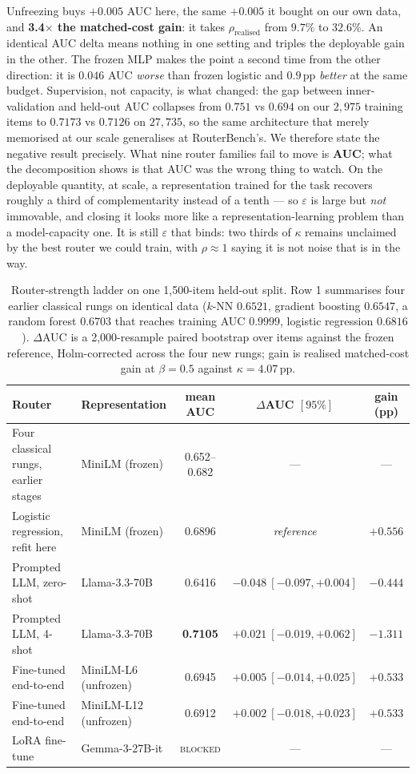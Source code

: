 \documentclass[10pt]{article}
\newcommand{\pp}{\,\text{pp}}
\newcommand{\FTAUC}{\textsc{blocked}}
\begin{document}
Unfreezing buys $+0.005$ AUC here, the same $+0.005$ it bought on our own data,
and \textbf{3.4$\times$ the matched-cost gain}: it takes
$\rho_{\text{realised}}$ from $9.7\%$ to $32.6\%$. An identical AUC delta means
nothing in one setting and triples the deployable gain in the other. The frozen
MLP makes the point a second time from the other direction: it is $0.046$ AUC
\emph{worse} than frozen logistic and $0.9\pp$ \emph{better} at the same budget.
Supervision, not capacity, is what changed: the gap between inner-validation and
held-out AUC collapses from $0.751$ vs $0.694$ on our $2{,}975$ training items to
$0.7173$ vs $0.7126$ on $27{,}735$, so the same architecture that merely
memorised at our scale generalises at RouterBench's.
We therefore state the negative result precisely. What nine router families fail
to move is \textbf{AUC}; what the decomposition shows is that AUC was the wrong
thing to watch. On the deployable quantity, at scale, a representation trained
for the task recovers roughly a third of complementarity instead of a tenth ---
so $\varepsilon$ is large but \emph{not} immovable, and closing it looks more
like a representation-learning problem than a model-capacity one. It is still
$\varepsilon$ that binds: two thirds of $\kappa$ remains unclaimed by the best
router we could train, with $\rho\approx1$ saying it is not noise that is in the
way.

\begin{table}[t]\centering\small
\caption{Router-strength ladder on one 1{,}500-item held-out split. Row 1
summarises four earlier classical rungs on identical data ($k$-NN $0.6521$,
gradient boosting $0.6547$, a random forest $0.6703$ that reaches training AUC
$0.9999$, logistic regression $0.6816$). $\Delta$AUC is a 2{,}000-resample
paired bootstrap over items against the frozen reference, Holm-corrected across
the four new rungs; gain is realised matched-cost gain at $\beta=0.5$ against
$\kappa=4.07\pp$.}
\label{tab:ladder}
\setlength{\tabcolsep}{4pt}
\begin{tabular}{llccc}
\toprule
Router & Representation & mean AUC & $\Delta$AUC $[95\%]$ & gain (pp) \\
\midrule
Four classical rungs, earlier stages & MiniLM (frozen) & 0.652--0.682 & --- & --- \\
\midrule
Logistic regression, refit here  & MiniLM (frozen) & 0.6896 & \emph{reference} & $+0.556$ \\
Prompted LLM, zero-shot  & Llama-3.3-70B & 0.6416 & $-0.048\ [-0.097,+0.004]$ & $-0.444$ \\
Prompted LLM, 4-shot     & Llama-3.3-70B & \textbf{0.7105} & $+0.021\ [-0.019,+0.062]$ & $\mathbf{-1.311}$ \\
Fine-tuned end-to-end    & MiniLM-L6 (unfrozen)   & 0.6945 & $+0.005\ [-0.014,+0.025]$ & $+0.533$ \\
Fine-tuned end-to-end    & MiniLM-L12 (unfrozen)  & 0.6912 & $+0.002\ [-0.018,+0.023]$ & $+0.533$ \\
LoRA fine-tune           & Gemma-3-27B-it & \FTAUC & --- & --- \\
\bottomrule
\end{tabular}
\end{table}
\end{document}
